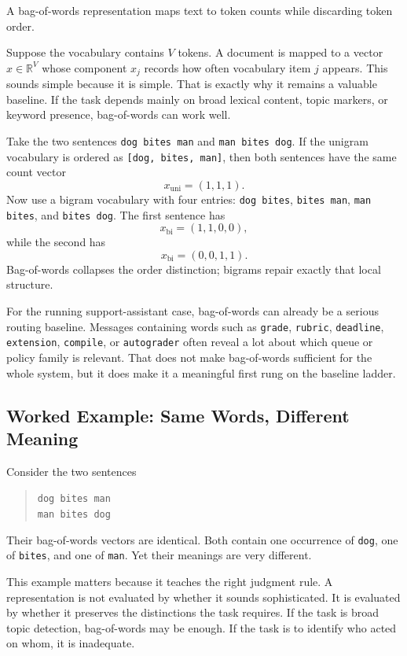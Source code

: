 \begin{definition}
A bag-of-words representation maps text to token counts while discarding token order.
\end{definition}

Suppose the vocabulary contains $V$ tokens. A document is mapped to a vector $x \in \mathbb{R}^{V}$ whose component $x_j$ records how often vocabulary item $j$ appears. This sounds simple because it is simple. That is exactly why it remains a valuable baseline. If the task depends mainly on broad lexical content, topic markers, or keyword presence, bag-of-words can work well.

\begin{mathlens}
Take the two sentences \texttt{dog bites man} and \texttt{man bites dog}. If the unigram vocabulary is ordered as \texttt{[dog, bites, man]}, then both sentences have the same count vector
\[
x_{\text{uni}}=(1,1,1).
\]
Now use a bigram vocabulary with four entries:
\texttt{dog bites}, \texttt{bites man}, \texttt{man bites}, and \texttt{bites dog}. The first sentence has
\[
x_{\text{bi}}=(1,1,0,0),
\]
while the second has
\[
x_{\text{bi}}=(0,0,1,1).
\]
Bag-of-words collapses the order distinction; bigrams repair exactly that local structure.
\end{mathlens}

For the running support-assistant case, bag-of-words can already be a serious routing baseline. Messages containing words such as \texttt{grade}, \texttt{rubric}, \texttt{deadline}, \texttt{extension}, \texttt{compile}, or \texttt{autograder} often reveal a lot about which queue or policy family is relevant. That does not make bag-of-words sufficient for the whole system, but it does make it a meaningful first rung on the baseline ladder.

\subsection{Worked Example: Same Words, Different Meaning}

Consider the two sentences
\begin{quote}
\texttt{dog bites man}\\
\texttt{man bites dog}
\end{quote}
Their bag-of-words vectors are identical. Both contain one occurrence of \texttt{dog}, one of \texttt{bites}, and one of \texttt{man}. Yet their meanings are very different.

This example matters because it teaches the right judgment rule. A representation is not evaluated by whether it sounds sophisticated. It is evaluated by whether it preserves the distinctions the task requires. If the task is broad topic detection, bag-of-words may be enough. If the task is to identify who acted on whom, it is inadequate.

